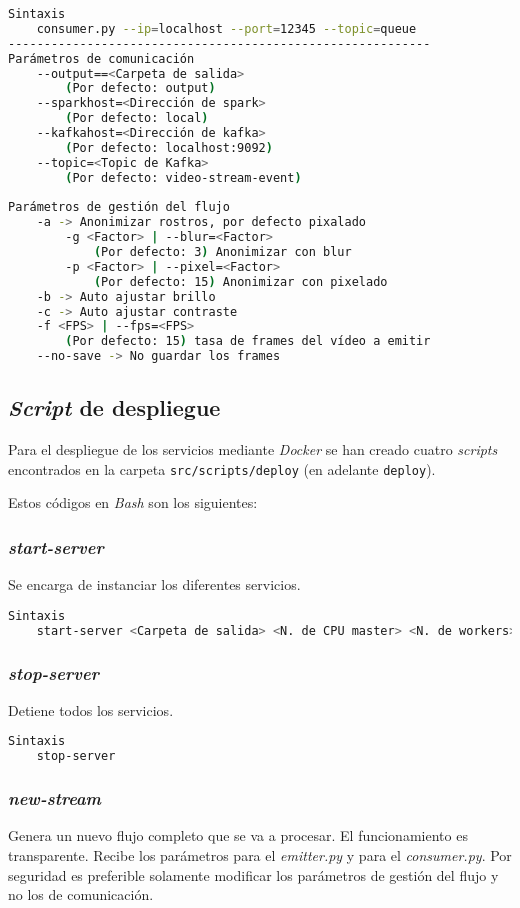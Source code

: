 \begin{lstlisting}[language=Bash]
Sintaxis
	consumer.py --ip=localhost --port=12345 --topic=queue 
-----------------------------------------------------------
Parámetros de comunicación
	--output==<Carpeta de salida> 
		(Por defecto: output)
	--sparkhost=<Dirección de spark>
		(Por defecto: local)
	--kafkahost=<Dirección de kafka> 
		(Por defecto: localhost:9092)
	--topic=<Topic de Kafka> 
		(Por defecto: video-stream-event)
		
Parámetros de gestión del flujo
	-a -> Anonimizar rostros, por defecto pixalado
		-g <Factor> | --blur=<Factor>
			(Por defecto: 3) Anonimizar con blur
		-p <Factor> | --pixel=<Factor>
			(Por defecto: 15) Anonimizar con pixelado
	-b -> Auto ajustar brillo
	-c -> Auto ajustar contraste
	-f <FPS> | --fps=<FPS> 
		(Por defecto: 15) tasa de frames del vídeo a emitir
	--no-save -> No guardar los frames
\end{lstlisting}

\subsection{\textit{Script} de despliegue}

Para el despliegue de los servicios mediante \textit{Docker} se han creado cuatro \textit{scripts} encontrados en la carpeta \texttt{src/scripts/deploy} (en adelante \texttt{deploy}).

Estos códigos en \textit{Bash} son los siguientes:

\subsubsection{\textit{start-server}}
Se encarga de instanciar los diferentes servicios.

\begin{lstlisting}[language=Bash]
Sintaxis
	start-server <Carpeta de salida> <N. de CPU master> <N. de workers> <N. de CPU por worker> <Memoria por worker>
\end{lstlisting}
\newpage
\subsubsection{\textit{stop-server}}
Detiene todos los servicios.

\begin{lstlisting}[language=Bash]
Sintaxis
	stop-server
\end{lstlisting}

\subsubsection{\textit{new-stream}}\label{sec:newstream}
Genera un nuevo flujo completo que se va a procesar. El funcionamiento es transparente. Recibe los parámetros para el \textit{emitter.py} y para el \textit{consumer.py}. Por seguridad es preferible solamente modificar los parámetros de gestión del flujo y no los de comunicación.

